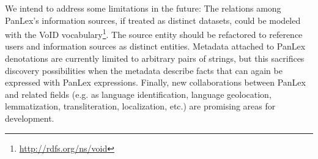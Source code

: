 \documentclass[sw]{iosart2c}
\begin{document}
\vfill

We intend to address some limitations in the future:
The relations among PanLex's information sources, if treated as distinct datasets, could be modeled with the VoID vocabulary\footnote{\url{http://rdfs.org/ns/void}}.
The source entity should be refactored to reference users and information sources as distinct entities.
Metadata attached to PanLex denotations are currently limited to arbitrary pairs of strings,
but this sacrifices discovery possibilities when the metadata
describe facts that can again be expressed with PanLex expressions.
Finally, new collaborations between PanLex and related fields (e.g. as language identification, language geolocation, lemmatization, transliteration, localization, etc.) are promising areas for development.

\vspace{-10pt}



\end{document}
